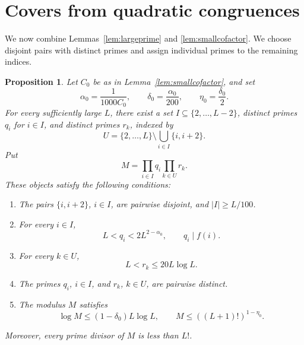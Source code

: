 \documentclass[11pt]{amsart}
\newtheorem{proposition}[theorem]{Proposition}
\theoremstyle{definition}
\theoremstyle{remark}
\begin{document}
\section{Covers from quadratic congruences}\label{sec:construction}

We now combine Lemmas~\ref{lem:largeprime} and \ref{lem:smallcofactor}.
We choose disjoint pairs with distinct primes and assign individual
primes to the remaining indices.

\begin{proposition}\label{prop:quadratic-cover}
Let $C_0$ be as in Lemma~\ref{lem:smallcofactor}, and set
\[
\alpha_0=\frac1{1000C_0},
\qquad
\delta_0=\frac{\alpha_0}{200},
\qquad
\eta_0=\frac{\delta_0}{2}.
\]
For every sufficiently large $L$, there exist a set
$I\subseteq\{2,\ldots,L-2\}$, distinct primes $q_i$ for $i\in I$, and
distinct primes $r_k$, indexed by
\[
U=\{2,\ldots,L\}\setminus\bigcup_{i\in I}\{i,i+2\}.
\]
Put
\[
M=\prod_{i\in I}q_i\prod_{k\in U}r_k.
\]
These objects satisfy the following conditions:
\begin{enumerate}
\item The pairs $\{i,i+2\}$, $i\in I$, are pairwise disjoint, and
$|I|\geq L/100$.
\item For every $i\in I$,
\[
L<q_i<2L^{2-\alpha_0},
\qquad
q_i\mid f(i).
\]
\item For every $k\in U$,
\[
L<r_k\leq20L\log L.
\]
\item The primes $q_i$, $i\in I$, and $r_k$, $k\in U$, are pairwise
distinct.
\item The modulus $M$ satisfies
\[
\log M\leq(1-\delta_0)L\log L,
\qquad
M\leq ((L+1)!)^{1-\eta_0}.
\]
\end{enumerate}
Moreover, every prime divisor of $M$ is less than $L!$.
\end{proposition}
\end{document}
